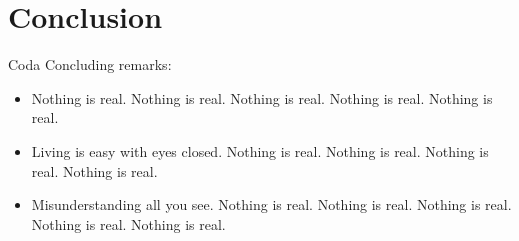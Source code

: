 \documentclass{beamer}
\begin{document}
\section{Conclusion}
\begin{frame}{Coda}
Concluding remarks:
    \begin{itemize}
        \item Nothing is real. Nothing is real. Nothing is real. Nothing is real. Nothing is real.
        \item \pause Living is easy with eyes closed. Nothing is real. Nothing is real. Nothing is real. Nothing is real.
        \item \pause Misunderstanding all you see. Nothing is real. Nothing is real. Nothing is real. Nothing is real. Nothing is real.
    \end{itemize}
\end{frame}
\end{document}

